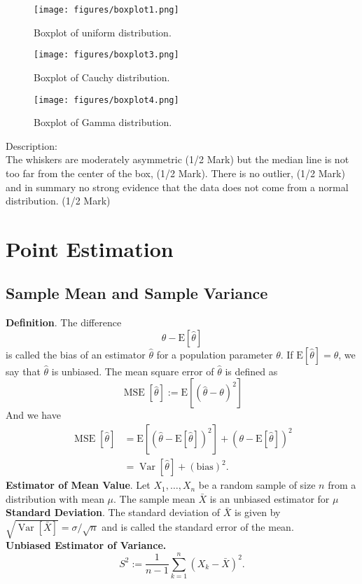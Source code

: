 \documentclass[a4paper,12pt]{article}
\begin{document}
\begin{figure}[h] 
    \centering
    \texttt{[image: figures/boxplot1.png]} 
    \caption{Boxplot of uniform distribution.} 
\end{figure}

\begin{figure}[h] 
    \centering
    \texttt{[image: figures/boxplot3.png]} 
    \caption{Boxplot of Cauchy distribution.} 
\end{figure}


\begin{figure}[!h] 
    \centering
    \texttt{[image: figures/boxplot4.png]} 
    \caption{Boxplot of Gamma distribution.} 
\end{figure}

\noindent Description:\\
The whiskers are moderately asymmetric (1/2 Mark) but the median line is not too far from the center of the box, (1/2 Mark). There is no outlier, (1/2 Mark) and in summary no strong evidence that the data does not come from a normal distribution. (1/2 Mark)

\section{Point Estimation}
\subsection{Sample Mean and Sample Variance}
\textbf{Definition}. The difference
$$
\theta-\mathrm{E}[\hat{\theta}]
$$
is called the bias of an estimator $\hat{\theta}$ for a population parameter $\theta$. If $\mathrm{E}[\widehat{\theta}]=\theta$, we say that $\widehat{\theta}$ is unbiased.
The mean square error of $\hat{\theta}$ is defined as
$$
\operatorname{MSE}[\widehat{\theta}]:=\mathrm{E}\left[(\widehat{\theta}-\theta)^2\right]
$$
And we have
\begin{equation}
    \begin{aligned}
    \operatorname{MSE}[\widehat{\theta}] & =\mathrm{E}\left[(\widehat{\theta}-\mathrm{E}[\widehat{\theta}])^2\right]+(\theta-\mathrm{E}[\widehat{\theta}])^2 \\
    & =\operatorname{Var}[\widehat{\theta}]+(\text {bias})^2 .
    \end{aligned}
    \end{equation}
\textbf{Estimator of Mean Value}. Let $X_1, \ldots, X_n$ be a random sample of size $n$ from a distribution with mean $\mu$. The sample mean $\bar{X}$ is an unbiased estimator for $\mu$\\
\textbf{Standard Deviation}. The standard deviation of $\bar{X}$ is given by $\sqrt{\operatorname{Var}[\bar{X}]}=\sigma / \sqrt{n}$ and is called the standard error of the mean.\\
\textbf{Unbiased Estimator of Variance.}
\begin{equation}
    S^2:=\frac{1}{n-1} \sum_{k=1}^n\left(X_k-\bar{X}\right)^2 .
    \end{equation}
\end{document}
